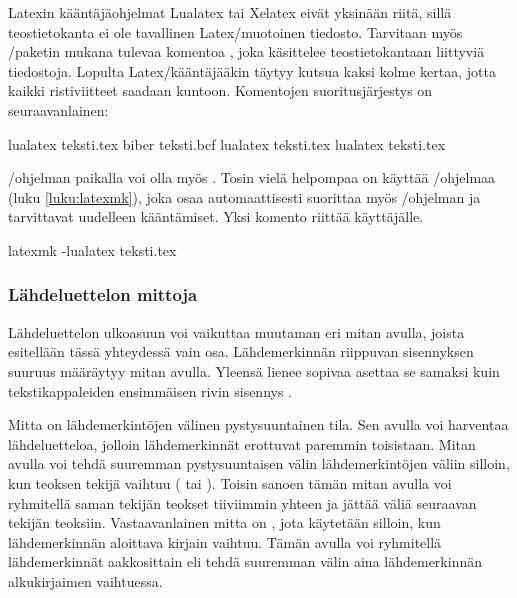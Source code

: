 Latexin kääntäjä\-ohjelmat Lualatex tai Xelatex eivät yksinään riitä,
sillä teostietokanta ei ole tavallinen Latex\-/muotoinen tiedosto.
Tarvitaan myös \-/paketin mukana tulevaa komentoa
, joka käsittelee teostietokantaan liittyviä tiedostoja.
Lopulta Latex\-/kääntäjääkin täytyy kutsua kaksi kolme kertaa, jotta
kaikki ristiviitteet saadaan kuntoon. Komentojen suoritusjärjestys on
seuraavanlainen:

\begin{koodilohkosis}
  lualatex teksti.tex
  biber teksti.bcf
  lualatex teksti.tex
  lualatex teksti.tex
\end{koodilohkosis}

\-/ohjelman paikalla voi olla myös .
Tosin vielä helpompaa on käyttää \-/ohjelmaa (luku
\ref{luku:latexmk}), joka osaa automaattisesti suorittaa myös
\-/ohjelman ja tarvittavat uudelleen kääntämiset. Yksi
komento riittää käyttäjälle.

\begin{koodilohkosis}
  latexmk -lualatex teksti.tex    %
\end{koodilohkosis}

\subsubsection{Lähdeluettelon mittoja}

Lähdeluettelon ulkoasuun voi vaikuttaa muutaman eri mitan avulla, joista
esitellään tässä yhteydessä vain osa. Lähdemerkinnän riippuvan
sisennyksen suuruus määräytyy mitan  avulla.
Yleensä lienee sopivaa asettaa se samaksi kuin tekstikappaleiden
ensimmäisen rivin sisennys .

\begin{koodilohkosis}
  \setlength{\parindent}{1.1em} %
  \setlength{\bibhang}{\parindent}
\end{koodilohkosis}

Mitta  on lähdemerkintöjen välinen
pystysuuntainen tila. Sen avulla voi harventaa lähdeluetteloa, jolloin
lähdemerkinnät erottuvat paremmin toisistaan. Mitan  avulla voi tehdä suuremman pystysuuntaisen välin
lähdemerkintöjen väliin silloin, kun teoksen tekijä vaihtuu
( tai ). Toisin sanoen tämän mitan avulla
voi ryhmitellä saman tekijän teokset tiiviimmin yhteen ja jättää väliä
seuraavan tekijän teoksiin. Vastaavanlainen mitta on , jota käytetään silloin, kun lähdemerkinnän aloittava
kirjain vaihtuu. Tämän avulla voi ryhmitellä lähdemerkinnät aakkosittain
eli tehdä suuremman välin aina lähdemerkinnän alkukirjaimen vaihtuessa.

